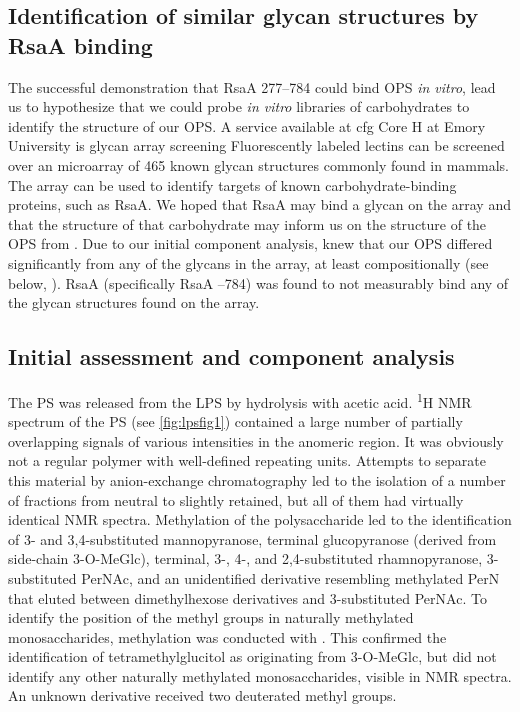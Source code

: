 \subsection{Identification of similar glycan structures by RsaA binding} \label{sec:ident-simil-glyc}
  
The successful demonstration that RsaA \del{}277--784 could bind \caulobacter{} \ac{OPS} \textit{in vitro}, lead us to hypothesize that we could probe \textit{in vitro} libraries of carbohydrates to identify the structure of our \ac{OPS}. A service available at \ac{cfg} Core H at Emory University is glycan array screening Fluorescently labeled lectins can be screened over an microarray of 465 known glycan structures commonly found in mammals. The array can be used to identify targets of known carbohydrate-binding proteins, such as RsaA. We hoped that RsaA may bind a glycan on the array and that the structure of that carbohydrate may inform us on the structure of the \ac{OPS} from \caulobacter. Due to our initial component analysis, knew that our \ac{OPS} differed significantly from any of the glycans in the array, at least compositionally (see below, ). RsaA (specifically RsaA --784) was found to not measurably bind any of the glycan structures found on the array. 

\subsection{Initial assessment and component analysis} %
\label{sub:initial_assessment_and_component_analysis}

The \ac{PS} was released from the \ac{LPS} by hydrolysis with acetic acid. \textsuperscript{1}H
\ac{NMR} spectrum of the \ac{PS} (see \cref{fig:lpsfig1}) contained a large number of partially
overlapping signals of various intensities in the anomeric region. It was obviously not a regular
polymer with well-defined repeating units. Attempts to separate this material by anion-exchange
chromatography led to the isolation of a number of fractions from neutral to slightly retained,
but all of them had virtually identical \ac{NMR} spectra. Methylation of the polysaccharide led to
the identification of 3- and 3,4-substituted mannopyranose, terminal glucopyranose (derived from
side-chain 3-O-MeGlc), terminal, 3-, 4-, and 2,4-substituted rhamnopyranose, 3-substituted PerNAc,
and an unidentified derivative resembling methylated PerN that eluted between dimethylhexose
derivatives and 3-substituted PerNAc. To identify the position of the methyl groups in naturally
methylated monosaccharides, methylation was conducted with . This confirmed the
identification of tetramethylglucitol as originating from 3-O-MeGlc, but did not identify any
other naturally methylated monosaccharides, visible in \ac{NMR} spectra. An unknown derivative
received two deuterated methyl groups.

